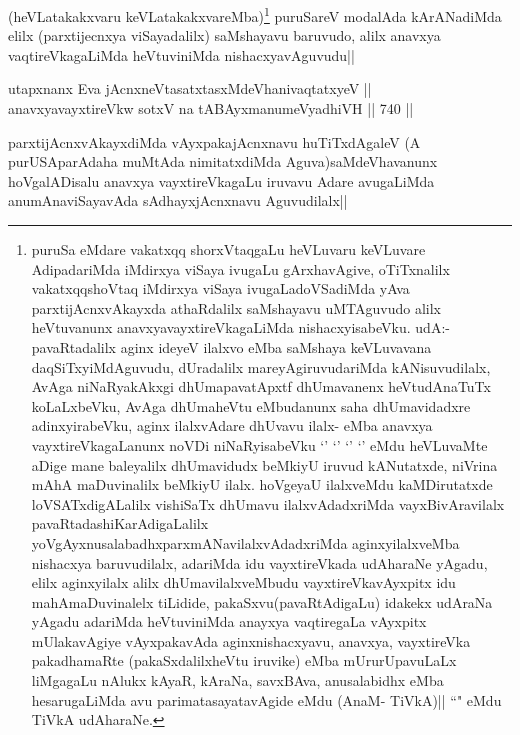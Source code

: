 \begin{artha}
(heVLatakakxvaru keVLatakakxvareMba)\footnote{puruSa eMdare vakatxqq shorxVtaqgaLu heVLuvaru keVLuvare AdipadariMda iMdirxya viSaya ivugaLu gArxhavAgive, oTiTxnalilx vakatxqqshoVtaq iMdirxya viSaya ivugaLadoVSadiMda yAva parxtijAcnxvAkayxda athaRdalilx saMshayavu uMTAguvudo alilx heVtuvanunx anavxyavayxtireVkagaLiMda nishacxyisabeVku. udA:- pavaRtadalilx aginx ideyeV ilalxvo eMba saMshaya keVLuvavana daqSiTxyiMdAguvudu, dUradalilx mareyAgiruvudariMda kANisuvudilalx, AvAga niNaRyakAkxgi dhUmapavatApxtf dhUmavanenx heVtudAnaTuTx koLaLxbeVku, AvAga dhUmaheVtu eMbudanunx saha dhUmavidadxre adinxyirabeVku, aginx ilalxvAdare dhUvavu ilalx- eMba anavxya vayxtireVkagaLanunx noVDi niNaRyisabeVku `\stext' `\stext' `\stext' `\stext' eMdu heVLuvaMte aDige mane baleyalilx dhUmavidudx beMkiyU iruvud kANutatxde, niVrina mAhA maDuvinalilx beMkiyU ilalx. hoVgeyaU ilalxveMdu kaMDirutatxde loVSATxdigALalilx vishiSaTx dhUmavu ilalxvAdadxriMda vayxBivAravilalx pavaRtadashiKarAdigaLalilx yoVgAyxnusalabadhxparxmANavilalxvAdadxriMda aginxyilalxveMba nishacxya baruvudilalx, adariMda idu vayxtireVkada udAharaNe yAgadu, elilx aginxyilalx alilx dhUmavilalxveMbudu vayxtireVkavAyxpitx idu mahAmaDuvinalelx tiLidide, pakaSxvu(pavaRtAdigaLu) idakekx udAraNa yAgadu adariMda heVtuviniMda anayxya vaqtiregaLa vAyxpitx mUlakavAgiye vAyxpakavAda aginxnishacxyavu, anavxya, vayxtireVka pakadhamaRte (pakaSxdalilxheVtu iruvike) eMba mUrurUpavuLaLx liMgagaLu nAlukx kAyaR, kAraNa, savxBAva, anusalabidhx eMba hesarugaLiMda avu parimatasayatavAgide eMdu (AnaM- TiVkA)|| ``\stext" eMdu TiVkA udAharaNe.} puruSareV modalAda kArANadiMda elilx (parxtijecnxya viSayadalilx) saMshayavu baruvudo, alilx anavxya vaqtireVkagaLiMda heVtuviniMda nishacxyavAguvudu||
\end{artha}

\begin{shl}
utapxnanx Eva jAcnxneV\s tasatxtasxMdeVhanivaqtatxyeV || \\
anavxyavayxtireVkw sotxV na tABAyxmanumeVyadhiVH ||  740 ||  
\end{shl}

\begin{artha}
parxtijAcnxvAkayxdiMda vAyxpakajAcnxnavu huTiTxdAgaleV (A purUSAparAdaha muMtAda nimitatxdiMda Aguva)saMdeVhavanunx hoVgalADisalu anavxya vayxtireVkagaLu iruvavu Adare avugaLiMda anumAnaviSayavAda sAdhayxjAcnxnavu Aguvudilalx||
\end{artha}


